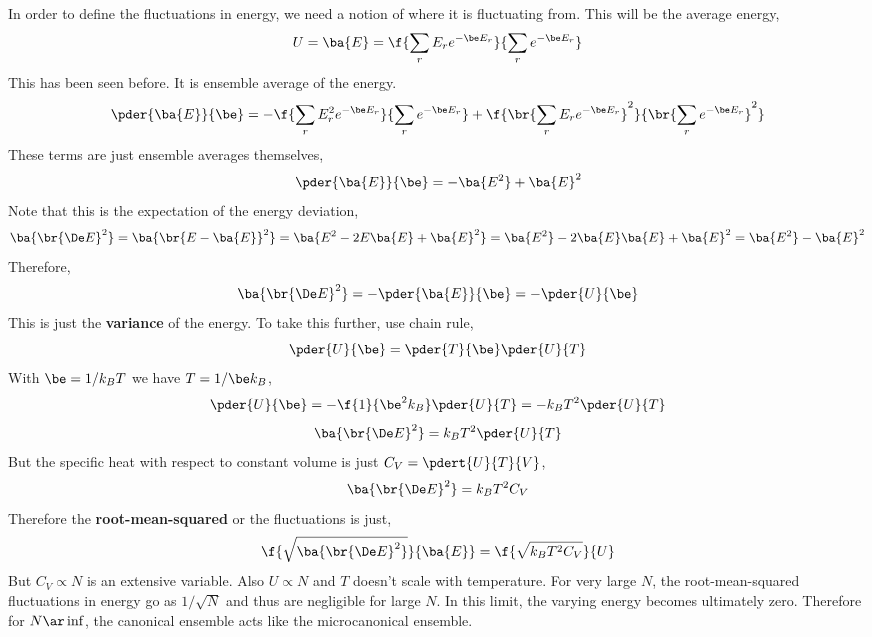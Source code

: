 \documentclass{article}
\begin{document}
{In order to define the fluctuations in energy, we need a notion of where it is fluctuating from. This will be the average energy,
\[ U = \ba{E} = \f{\sum_r E_re^{-\be E_r}}{\sum_r e^{-\be E_r}} \]
This has been seen before. It is ensemble average of the energy.
\[ \pder{\ba{E}}{\be} = -\f{\sum_r E_r^2 e^{-\be E_r}}{\sum_r e^{-\be E_r}} + \f{\br{\sum_r E_r e^{-\be E_r}}^2}{\br{\sum_r e^{-\be E_r}}^2} \]
These terms are just ensemble averages themselves,
\[ \pder{\ba{E}}{\be} = - \ba{E^2} + \ba{E}^2 \]
Note that this is the expectation of the energy deviation,
\[ \ba{\br{\De E}^2} = \ba{\br{E - \ba{E}}^2} = \ba{E^2 - 2E\ba{E} + \ba{E}^2} = \ba{E^2} - 2\ba{E}\ba{E} + \ba{E}^2 = \ba{E^2} - \ba{E}^2 \]
Therefore,
\[ \ba{\br{\De E}^2} =- \pder{\ba{E}}{\be} = - \pder{U}{\be}  \]
This is just the \textbf{variance} of the energy. To take this further, use chain rule,
\[ \pder{U}{\be} = \pder{T}{\be}\pder{U}{T} \]
With $\be = 1/k_B T$ we have $T = 1/ \be k_B$,
\[ \pder{U}{\be} = -\f{1}{\be^2 k_B}\pder{U}{T} = -k_B T^2 \pder{U}{T} \]
\[ \ba{\br{\De E}^2} = k_B T^2 \pder{U}{T} \]
But the specific heat with respect to constant volume is just $C_V = \pdert{U}{T}{V}$,
\[ \ba{\br{\De E}^2} = k_B T^2 C_V \]
Therefore the \textbf{root-mean-squared} or the fluctuations is just,
\[ \f{\sqrt{\ba{\br{\De E}^2}}}{\ba{E}} = \f{ \sqrt{k_B T^2 C_V} }{U} \]
But $C_V \propto N$ is an extensive variable. Also $U \propto N$ and $T$ doesn't scale with temperature. For very large $N$, the root-mean-squared fluctuations in energy go as $1/\sqrt{N}$ and thus are negligible for large $N$. In this limit, the varying energy becomes ultimately zero. Therefore for $N \ar \inf$, the canonical ensemble acts like the microcanonical ensemble. \\

}
\end{document}
